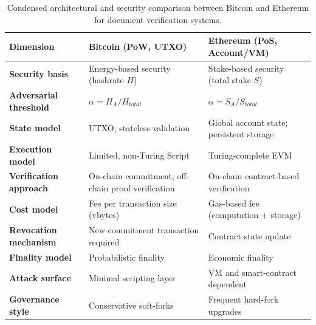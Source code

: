 \begin{table}[t]
\caption{Condensed architectural and security comparison between Bitcoin and Ethereum for document verification systems.}
\label{tab:btc_eth_comparison_short}
\centering
\small
\renewcommand{\arraystretch}{1.15}
\setlength{\tabcolsep}{4pt}

\begin{tabular}{
>{\raggedright\arraybackslash\bfseries}p{3.0cm}
>{\raggedright\arraybackslash}p{6.2cm}
>{\raggedright\arraybackslash}p{6.2cm}
}
\toprule
Dimension & Bitcoin (PoW, UTXO) & Ethereum (PoS, Account/VM) \\
\midrule

Security basis &
Energy-based security (hashrate $H$) &
Stake-based security (total stake $S$) \\

Adversarial threshold &
$\alpha = H_A/H_{total}$ &
$\alpha = S_A/S_{total}$ \\

State model &
UTXO; stateless validation &
Global account state; persistent storage \\

Execution model &
Limited, non-Turing Script &
Turing-complete EVM \\

Verification approach &
On-chain commitment, off-chain proof verification &
On-chain contract-based verification \\

Cost model &
Fee per transaction size (vbytes) &
Gas-based fee (computation + storage) \\

Revocation mechanism &
New commitment transaction required &
Contract state update \\

Finality model &
Probabilistic finality &
Economic finality \\

Attack surface &
Minimal scripting layer &
VM and smart-contract dependent \\

Governance style &
Conservative soft-forks &
Frequent hard-fork upgrades \\

\bottomrule
\end{tabular}
\end{table}
